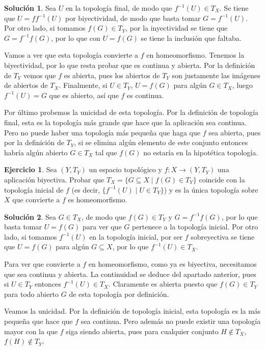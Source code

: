 \documentclass{article}
\theoremstyle{plain}
\theoremstyle{definition}
\newtheorem{exercise}{Ejercicio}
\newtheorem*{sol*}{Solución}
\begin{document}
\begin{sol*}
Sea $U$ en la topología final, de modo que $f^{-1}(U)\in T_X$. Se tiene que $U=ff^{-1}(U)$ por biyectividad, de modo que basta tomar $G=f^{-1}(U)$. Por otro lado, si tomamos $f(G)\in T_Y$, por la inyectividad se tiene que $G=f^{-1}f(G)$, por lo que con $U=f(G)$ se tiene la inclusión que faltaba.

Vamos a ver que esta topología convierte a $f$ en homeomorfismo. Tenemos la biyectividad, por lo que resta probar que es continua y abierta. Por la definición de $T_Y$ vemos que $f$ es abierta, pues los abiertos de $T_Y$ son justamente las imágenes de abiertos de $T_X$. Finalmente, si $U\in T_Y$, $U=f(G)$ para algún $G\in T_X$, luego $f^{-1}(U)=G$ que es abierto, así que $f$ es continua.

Por último probemos la unicidad de esta topología. Por la definición de topología final, esta es la topología más grande que hace que la aplicación sea continua. Pero no puede haber una topología más pequeña que haga que $f$ sea abierta, pues por la definición de $T_Y$, si se elimina algún elemento de este conjunto entonces habría algún abierto $G\in T_X$ tal que $f(G)$ no estaría en la hipotética topología. 
\end{sol*}

\begin{exercise}
Sea $(Y,T_Y)$ un espacio topológico y $f:X\longrightarrow (Y,T_Y)$ una aplicación biyectiva. Probar que $T_X=\{G\subseteq X\mid f(G)\in T_Y\}$ coincide con la topología inicial de $f$ (es decir, $\{f^{-1}(U)\mid U\in T_Y\}$) y es la única topología sobre $X$ que convierte a $f$ es homeomorfismo. 
\end{exercise}

\begin{sol*}
Sea $G\in T_X$, de modo que $f(G)\in T_Y$ y $G=f^{-1}f(G)$, por lo que basta tomar $U=f(G)$ para ver que $G$ pertenece a la topología inicial. Por otro lado, si tomamos $f^{-1}(U)$ en la topología inicial, por ser $f$ sobreyectiva se tiene que $U=f(G)$ para algún $G\subseteq X$, por lo que $f^{-1}(U)\in T_X$.

Para ver que convierte a $f$ en homeomorfismo, como ya es biyectiva, necesitamos que sea continua y abierta. La continuidad se deduce del apartado anterior, pues si $U\in T_Y$ entonces $f^{-1}(U)\in T_X$. Claramente es abierta puesto que $f(G)\in T_Y$ para todo abierto $G$ de esta topología por definición. 

Veamos la unicidad. Por la definición de topología inicial, esta topología es la más pequeña que hace que $f$ sea continua. Pero además no puede existir una topología mayor con la que $f$ siga siendo abierta, pues para cualquier conjunto $H\notin T_X$, $f(H)\notin T_Y$.
\end{sol*}
\end{document}
